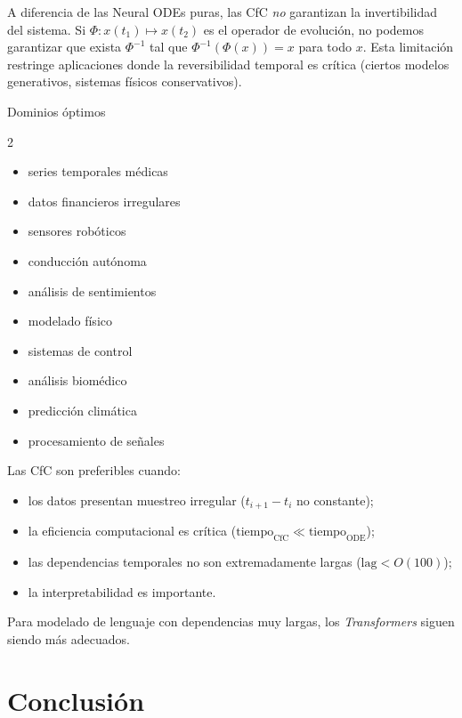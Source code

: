 \documentclass{claudeeditorial}
\begin{document}
A diferencia de las Neural ODEs puras, las CfC \emph{no} garantizan la invertibilidad del sistema. Si $\Phi: x(t_1)\mapsto x(t_2)$ es el operador de evolución, no podemos garantizar que exista $\Phi^{-1}$ tal que $\Phi^{-1}(\Phi(x))=x$ para todo $x$. Esta limitación restringe aplicaciones donde la reversibilidad temporal es crítica (ciertos modelos generativos, sistemas físicos conservativos).


\begin{ClaudeCard}{Dominios óptimos}
\begin{multicols}{2}
\begin{itemize}[leftmargin=1.2em,nosep]
\item series temporales médicas
\item datos financieros irregulares
\item sensores robóticos
\item conducción autónoma
\item análisis de sentimientos
\item modelado físico
\item sistemas de control
\item análisis biomédico
\item predicción climática
\item procesamiento de señales
\end{itemize}
\end{multicols}
\end{ClaudeCard}

\begin{ClaudeCheck}
Las CfC son preferibles cuando:
\begin{itemize}[leftmargin=1.2em,nosep]
\item los datos presentan muestreo irregular ($t_{i+1}-t_i$ no constante);
\item la eficiencia computacional es crítica ($\text{tiempo}_{\text{CfC}} \ll \text{tiempo}_{\text{ODE}}$);
\item las dependencias temporales no son extremadamente largas ($\text{lag} < O(100)$);
\item la interpretabilidad es importante.
\end{itemize}
Para modelado de lenguaje con dependencias muy largas, los \emph{Transformers} siguen siendo más adecuados.
\end{ClaudeCheck}

\section*{Conclusión}
\end{document}

